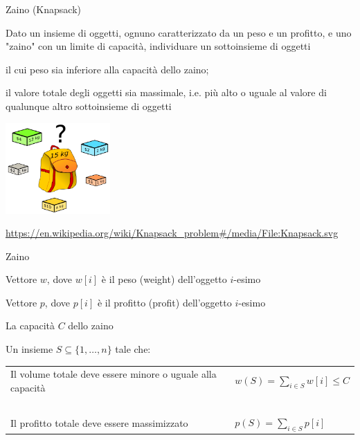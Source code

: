\begin{frame}{Zaino (Knapsack)}

\vspace{-9pt}
\begin{myboxtitle}
Dato un insieme di oggetti, ognuno caratterizzato da un \alert{peso} e un \alert{profitto},
e uno "zaino" con un limite di capacità, individuare un sottoinsieme di oggetti 
\BIL
\item il cui peso sia inferiore alla capacità dello zaino;\
\item il valore totale degli oggetti sia massimale, i.e.
più alto o uguale al valore di qualunque altro sottoinsieme di oggetti 
\EIL
\end{myboxtitle}

\begin{center}
\includegraphics[width=0.3\textwidth]{knapsack.png}
\end{center}

\footnotesize
\url{https://en.wikipedia.org/wiki/Knapsack_problem\#/media/File:Knapsack.svg}


\end{frame}

\begin{frame}{Zaino}

\vspace{-9pt}
\begin{myboxtitle}[Input]
\BIL
\item Vettore $w$, dove \alert{$w[i]$} è il \alert{peso} (\alert{weight}) dell'oggetto $i$-esimo
\item Vettore $p$, dove \alert{$p[i]$} è il \alert{profitto} (\alert{profit}) dell'oggetto $i$-esimo
\item La \alert{capacità} $C$ dello zaino
\EIL
\end{myboxtitle}

\begin{myboxtitle}[Output]
Un insieme $S \subseteq \{1, \ldots, n\}$ tale che:

\medskip
\begin{tabular}{P{5cm}P{5cm}}
Il \alert{volume totale} deve essere minore o uguale alla capacità &

$w(S) = \sum_{i \in S} w[i] \leq C$
\\
~\\
Il \alert{profitto totale} deve essere massimizzato &
$
p(S) = \sum_{i \in S} p[i]
$
\\
\end{tabular}
\end{myboxtitle}

\end{frame}

